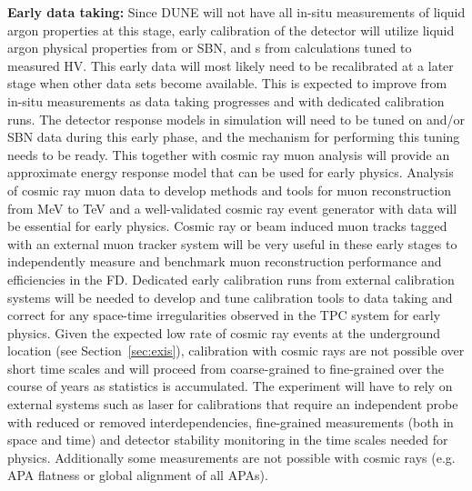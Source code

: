 \textbf{Early data taking:} Since DUNE will not have all in-situ measurements of liquid argon properties at this stage, early calibration of the detector will utilize liquid argon physical properties from  or SBN, and \efield{}s from calculations tuned to measured HV. This early data will most likely need to be recalibrated at a later stage when other data sets become available. This is expected to improve from in-situ measurements as data taking progresses and with dedicated calibration runs. The detector response models in simulation will need to be tuned on  and\slash or SBN data during this early phase, and the mechanism for performing this tuning needs to be ready. This together with cosmic ray muon analysis will provide an approximate energy response model that can be used for early physics. Analysis of cosmic ray muon data to develop methods and tools for muon reconstruction from MeV to TeV and a well-validated cosmic ray event generator with data will be essential for early physics. Cosmic ray or beam induced muon tracks tagged with an external muon tracker system will be very useful in these early stages to independently measure and benchmark muon reconstruction performance and efficiencies in the FD. Dedicated early calibration runs from external calibration systems will be needed to develop and tune calibration tools to data taking and correct for any space-time irregularities observed in the TPC system for early physics. Given the expected low rate of cosmic ray events at the underground location (see Section~\ref{sec:exis}), calibration with cosmic rays are not possible over short time scales and will proceed from coarse-grained to fine-grained over the course of years as statistics is accumulated. The experiment will have to rely on external systems such as laser for calibrations that require an independent probe with reduced or removed interdependencies, fine-grained measurements (both in space and time) and detector stability monitoring in the time scales needed for physics. Additionally some measurements are not possible with cosmic rays (e.g. APA flatness or global alignment of all APAs). 


